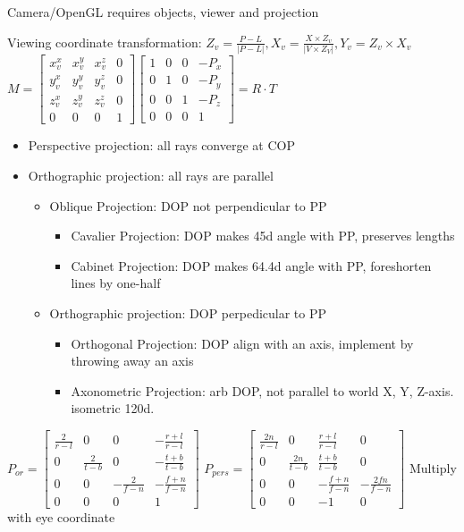 \documentclass[a4paper]{article}
\begin{document}
Camera/OpenGL requires objects, viewer and projection

Viewing coordinate transformation:
$Z_v = \frac{P-L}{|P-L|}, X_v = \frac{X \times Z_v}{|V \times Z_V|}, Y_v = Z_v \times X_v$ 
$M = \left[\begin{smallmatrix} x_v^x & x_v^y & x_v^z & 0\\
y_v^x & y_v^y & y_v^z & 0\\ z_v^x & z_v^y & z_v^z & 0 \\
0 & 0 & 0 & 1  \end{smallmatrix} \right] \left[\begin{smallmatrix} 1 & 0 & 0 & -P_x\\ 0 & 1 & 0 & -P_y \\ 0 & 0 & 1 & -P_z \\ 0 & 0 & 0 & 1 \end{smallmatrix} \right] = R\cdot T$ 

\begin{itemize}
	\item Perspective projection: all rays converge at COP
	\item Orthographic projection: all rays are parallel \begin{itemize}
		\item Oblique Projection: DOP not perpendicular to PP \begin{itemize}[leftmargin=0pt]
			\item Cavalier Projection: DOP makes 45d angle with PP, preserves lengths
			\item Cabinet Projection: DOP makes 64.4d angle with PP, foreshorten lines by one-half
		\end{itemize}
		
		\item Orthographic projection: DOP perpedicular to PP \begin{itemize}[leftmargin=0pt]
			\item Orthogonal Projection: DOP align with an axis, implement by throwing away an axis
			\item Axonometric Projection: arb DOP, not parallel to world X, Y, Z-axis. isometric 120d.
		\end{itemize}
		
	\end{itemize}
	
\end{itemize}

$P_{or} = \left[\begin{smallmatrix} \frac{2}{r-l} & 0 & 0 & - \frac{r+l}{r-l}\\ 0 & \frac{2}{t-b} & 0 &-\frac{t+b}{t-b}\\ 0 & 0 & -\frac{2}{f-n} & -\frac{f+n}{f-n}\\ 0 & 0 & 0 & 1\end{smallmatrix}\right] $  $P_{pers} = \left[\begin{smallmatrix} \frac{2n}{r-l} & 0 & \frac{r+l}{r-l} & 0 \\
0 & \frac{2n}{t-b} & \frac{t+b}{t-b} & 0\\
0 & 0 & -\frac{f+n}{f-n} & -\frac{2fn}{f-n}\\
 0 & 0 & -1 & 0
\end{smallmatrix} \right]$ 
Multiply with eye coordinate
\end{document}
